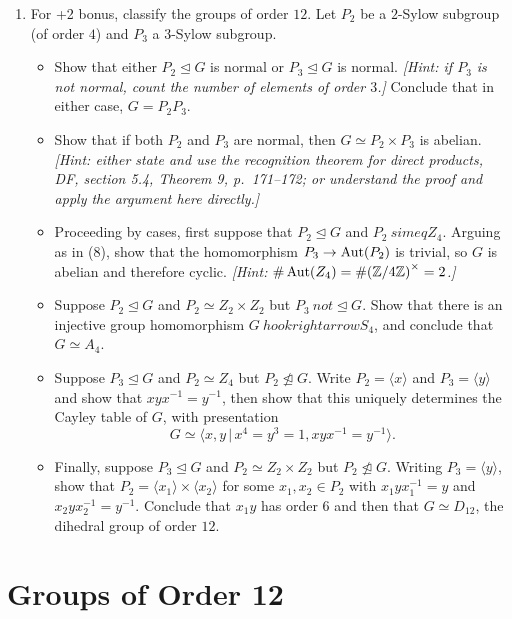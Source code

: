 \begin{Answer}
  \begin{enumerate}
  \item For +2 bonus, classify the groups of order $12$.  Let $P_2$ be a $2$-Sylow 
  subgroup (of order $4$) and $P_3$ a $3$-Sylow subgroup.  
  \begin{itemize}
  \item Show that either $P_2 \trianglelefteq G$ is normal or $P_3 \trianglelefteq G$
  is normal. 
  \emph{[Hint: if $P_3$ is not normal, count the number of elements of order $3$.]}  
  Conclude that in either case, $G=P_2P_3$.
  \item Show that if both $P_2$ and $P_3$ are normal, then $G \simeq P_2 \times P_3$ 
  is abelian.  \emph{[Hint: either state and use the recognition theorem for direct 
  products, DF, section 5.4, Theorem 9, p.~171--172; or understand the proof and 
  apply the argument here directly.]}
  \item Proceeding by cases, first suppose that $P_2 \trianglelefteq G$ and $P_2 \
  simeq Z_4$.  Arguing as in (8), show that the homomorphism $P_3 \to \operatorname{Aut}(P_2)$ is 
  trivial, so $G$ is abelian and therefore cyclic.  \emph{[Hint: 
  $\#\operatorname{Aut}(Z_4)=\#{(\mathbb{Z}/4\mathbb{Z})}^\times=2$.]}
  \item Suppose $P_2 \trianglelefteq G$ and $P_2 \simeq Z_2 \times Z_2$ but $P_3 \
  not\trianglelefteq G$.  Show that there is an injective group homomorphism $G \
  hookrightarrow S_4$, and conclude that $G \simeq A_4$.
  \item Suppose $P_3 \trianglelefteq G$ and $P_2 \simeq Z_4$ but $P_2 \not
  \trianglelefteq G$.  Write $P_2=\langle x \rangle$ and $P_3=\langle y \rangle$ and 
  show that $xyx^{-1}=y^{-1}$, then show that this uniquely determines the Cayley 
  table of $G$, with presentation
  \[ G \simeq \langle x,y \,|\, x^4=y^3=1, xyx^{-1}=y^{-1} \rangle. \]
  \item Finally, suppose $P_3 \trianglelefteq G$ and $P_2 \simeq Z_2 \times Z_2$ but 
  $P_2 \not\trianglelefteq G$.  Writing $P_3 = \langle y \rangle$, show that $P_2 = 
  \langle x_1 \rangle \times \langle x_2 \rangle$ for some $x_1,x_2 \in P_2$ with 
  $x_1yx_1^{-1}=y$ and $x_2yx_2^{-1}=y^{-1}$.  Conclude that $x_1y$ has order $6$ and
  then that $G \simeq D_{12}$, the dihedral group of order $12$.   
  \end{itemize}
  \end{enumerate}
\end{Answer}


\section{Groups of Order 12}

